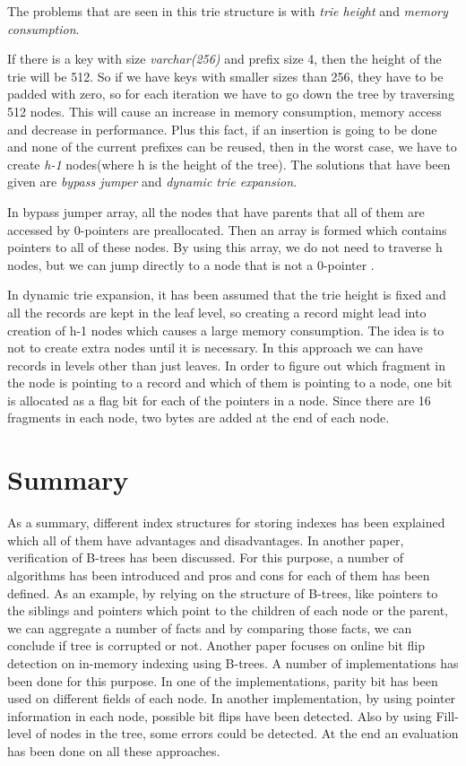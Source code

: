 \documentclass[12pt]{report}
\begin{document}
The problems that are seen in this trie structure is with \textit{trie height} and \textit {memory consumption}.

If there is a key with size \textit{varchar(256)} and prefix size 4, then the height of the trie will be 512. So if we have keys with smaller sizes than 256, they have to be padded with zero, so for each iteration we have to go down the tree by traversing 512 nodes. This will cause an increase in memory consumption, memory access and decrease in performance. Plus this fact, if an insertion is going to be done and none of the current prefixes can be reused, then in the worst case, we have to create \textit{h-1} nodes(where h is the height of the tree). The solutions that have been given are \textit{bypass jumper} and \textit{dynamic trie expansion}.

In bypass jumper array, all the nodes that have parents that all of them are accessed by 0-pointers are preallocated. Then an array is formed which contains pointers to all of these nodes. By using this array, we do not need to traverse h nodes, but we can jump directly to a node that is not a 0-pointer .


In dynamic trie expansion, it has been assumed that the trie height is fixed and all the records are kept in the leaf level, so creating a record might lead into creation of h-1 nodes which causes a large memory consumption. The idea is to not to create extra nodes until it is necessary. In this approach we can have records in levels other than just leaves. In order to figure out which fragment in the node is pointing to a record and which of them is pointing to a node, one bit is allocated as a flag bit for each of the pointers in a node. Since there are 16 fragments in each node, two bytes are added at the end of each node. 




\section{Summary}

As a summary, different index structures for storing indexes has been explained which all of them have advantages and disadvantages. In another paper, verification of B-trees has been discussed. For this purpose, a number of algorithms has been introduced and pros and cons for each of them has been defined. As an example, by relying on the structure of B-trees, like pointers to the siblings and pointers which point to the children of each node or the parent, we can aggregate a number of facts and by comparing those facts, we can conclude if tree is corrupted or not.  Another paper focuses on online bit flip detection on in-memory indexing using B-trees. A number of implementations has been done for this purpose. In one of the implementations, parity bit has been used on different fields of each node. In another implementation, by using pointer information in each node, possible bit flips have been detected. Also by using Fill-level of nodes in the tree, some errors could be detected. At the end an evaluation has been done on all these approaches.
\end{document}
